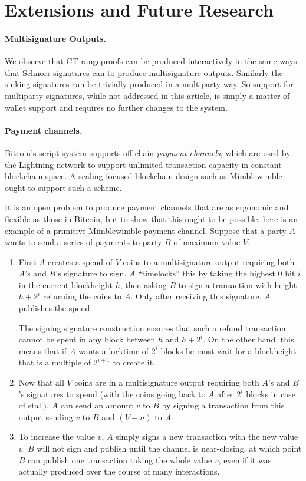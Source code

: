 \documentclass[letterpaper]{article}
\begin{document}
\section{Extensions and Future Research\label{sec:ext}}

\paragraph{Multisignature Outputs.} We observe that CT rangeproofs can be
produced interactively in the same ways that Schnorr signatures can to
produce multisignature outputs. Similarly the sinking signatures can be
trivially produced in a multiparty way. So support for multiparty signatures,
while not addressed in this article, is simply a matter of wallet support
and requires no further changes to the system.

\paragraph{Payment channels.} Bitcoin's script system supports off-chain
\emph{payment channels}, which are used by the Lightning network\cite{poon+dryja2016}
to support unlimited transaction capacity in constant blockchain space.
A scaling-focused blockchain design such as Mimblewimble ought to support
such a scheme.

It is an open problem to produce payment channels that are as ergonomic
and flexible as those in Bitcoin, but to show that this ought to be possible,
here is an example of a primitive Mimblewimble payment channel. Suppose that
a party $A$ wants to send a series of payments to party $B$ of maximum value
$V$.
\begin{enumerate}
\item First $A$ creates a spend of $V$ coins to a multisignature output
requiring both $A$'s and $B$'s signature to sign. $A$ ``timelocks'' this
by taking the highest 0 bit $i$ in the current blockheight $h$, then asking
$B$ to sign a transaction with height $h + 2^i$ returning the coins to $A$.
Only after receiving this signature, $A$ publishes the spend.

The signing signature construction ensures that such a refund transaction
cannot be spent in any block between $h$ and $h+2^i$. On the other hand,
this means that if $A$ wants a locktime of $2^i$ blocks he must wait for
a blockheight that is a multiple of $2^{i+1}$ to create it.

\item Now that all $V$ coins are in a multisignature output requiring both
$A$'s and $B$'s signatures to spend (with the coins going back to $A$
after $2^i$ blocks in case of stall), $A$ can send an amount $v$ to $B$ by
signing a transaction from this output sending $v$ to $B$ and $(V-n)$ to $A$.

\item To increase the value $v$, $A$ simply signs a new transaction with
the new value $v$. $B$ will not sign and publish until the channel is
near-closing, at which point $B$ can publish one transaction taking the
whole value $v$, even if it was actually produced over the course of many
interactions.
\end{enumerate}
\end{document}
